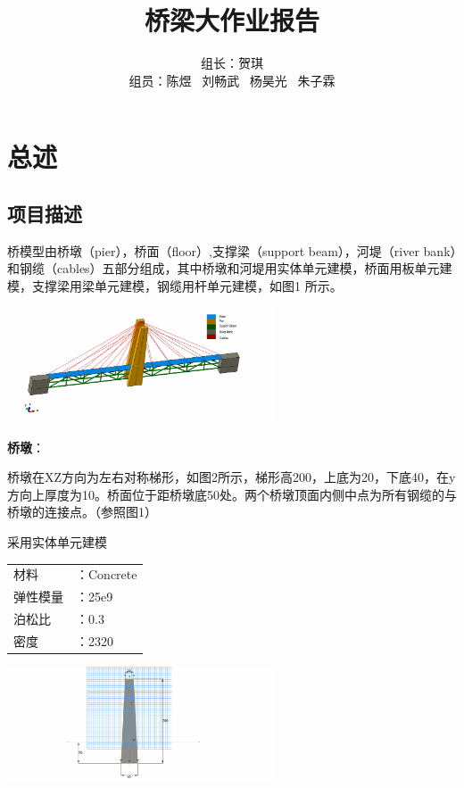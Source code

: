 \documentclass[UTF8]{ctexbook}
\title{桥梁大作业报告}
\author{组长：贺琪 \\ 组员：陈煜 \ 刘畅武 \ 杨昊光 \ 朱子霖}
\begin{document}
\maketitle

\tableofcontents

\newpage
\section{总述}
\subsection{项目描述}
桥模型由桥墩（pier），桥面（floor）,支撑梁（support beam），河堤（river bank）和钢缆（cables）五部分组成，其中桥墩和河堤用实体单元建模，桥面用板单元建模，支撑梁用梁单元建模，钢缆用杆单元建模，如图1 所示。\\
\begin{center}
\includegraphics[width=0.6\textwidth]{01.png} %
\end{center}

\textbf{桥墩}：

桥墩在XZ方向为左右对称梯形，如图2所示，梯形高200，上底为20，下底40，在y方向上厚度为10。桥面位于距桥墩底50处。两个桥墩顶面内侧中点为所有钢缆的与桥墩的连接点。（参照图1）

采用实体单元建模

\begin{center}
\begin{tabular}{ll}
材料&：Concrete\\
弹性模量&：25e9\\
泊松比&：0.3\\
密度&：2320\\
\end{tabular}
\end{center}

\begin{center}
\includegraphics[width=0.6\textwidth]{02.png}
\end{center}
\end{document}
